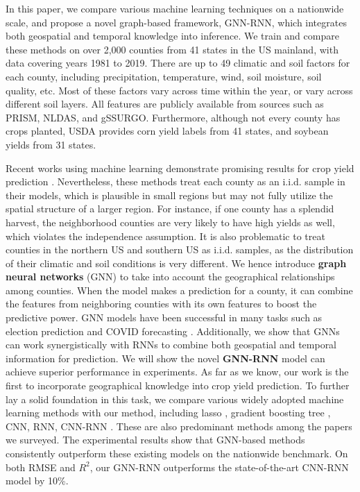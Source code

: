 In this paper, we compare various machine learning techniques on a nationwide scale, and propose a novel graph-based framework, GNN-RNN, which integrates both geospatial and temporal knowledge into inference. We train and compare these methods on over 2,000 counties from 41 states in the US mainland, with data covering years 1981 to 2019. There are up to 49 climatic and soil factors for each county, including precipitation, temperature, wind, soil moisture, soil quality, etc. Most of these factors vary across time within the year, or vary across different soil layers. All features are publicly available from sources such as PRISM, NLDAS, and gSSURGO. Furthermore, although not every county has crops planted, USDA provides corn yield labels from 41 states, and soybean yields from 31 states. 

Recent works using machine learning demonstrate promising results for crop yield prediction \cite{khaki2020cnn}. Nevertheless, these methods treat each county as an i.i.d. sample in their models, which is plausible in small regions but may not fully utilize the spatial structure of a larger region. For instance, if one county has a splendid harvest, the neighborhood counties are very likely to have high yields as well, which violates the independence assumption. It is also problematic to treat counties in the northern US and southern US as i.i.d. samples, as the distribution of their climatic and soil conditions is very different. We hence introduce \textbf{graph neural networks} (GNN) \cite{wu2020comprehensive} to take into account the geographical relationships among counties. When the model makes a prediction for a county, it can combine the features from neighboring counties with its own features to boost the predictive power. GNN models have been successful in many tasks such as election prediction \cite{jia2020residual} and COVID forecasting \cite{kapoor2020examining}. Additionally, we show that GNNs can work synergistically with RNNs to combine both geospatial and temporal information for prediction. We will show the novel \textbf{GNN-RNN} model can achieve superior performance in experiments. As far as we know, our work is the first to incorporate geographical knowledge into crop yield prediction. 
To further lay a solid foundation in this task, we compare various widely adopted machine learning methods with our method, including lasso \cite{tibshirani1996regression}, gradient boosting tree \cite{friedman2001elements}, CNN, RNN, CNN-RNN \cite{khaki2020cnn}. These are also predominant methods among the papers we surveyed. The experimental results show that GNN-based methods consistently outperform these existing models on the nationwide benchmark. On both RMSE and $R^2$, our GNN-RNN outperforms the state-of-the-art CNN-RNN model by 10\%.
